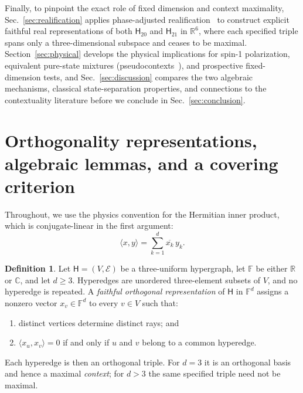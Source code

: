\documentclass[twocolumn,aps,pra,floatfix,amsmath,amssymb,longbibliography]{revtex4-2}
\newenvironment{handrewrite}{\leavevmode\color{blue}}{}
\theoremstyle{definition}
\newtheorem{definition}[theorem]{Definition}
\theoremstyle{remark}
\newcommand{\C}{\mathbb C}
\newcommand{\R}{\mathbb R}
\newcommand{\Htwenty}{\mathsf H_{20}}
\newcommand{\Htwentyone}{\mathsf H_{21}}
\begin{document}
\begin{handrewrite}
Finally, to pinpoint the exact role of fixed dimension and context maximality, Sec.~\ref{sec:realification} applies phase-adjusted realification~\cite{svozil-2025-rvc} to construct explicit faithful real representations of both $\Htwenty$ and $\Htwentyone$ in $\R^6$, where each specified triple spans only a three-dimensional subspace and ceases to be maximal.  Section~\ref{sec:physical} develops the physical implications for spin-1 polarization, equivalent pure-state mixtures (pseudocontexts~\cite{2026-Navara-Svozil-pseudocontexts}), and prospective fixed-dimension tests, and Sec.~\ref{sec:discussion} compares the two algebraic mechanisms, classical state-separation properties, and connections to the contextuality literature before we conclude in Sec.~\ref{sec:conclusion}.
\end{handrewrite}

\section{Orthogonality representations, algebraic lemmas, and a covering criterion}
\label{sec:prelim}

Throughout, we use the physics convention for the Hermitian inner product,
which is conjugate-linear in the first argument:
\begin{equation}
 \langle x,y\rangle=\sum_{k=1}^{d}\overline{x_k}\,y_k.
 \label{eq:inner-product}
\end{equation}

\begin{definition}
\label{def:for}
Let $\mathsf H=(V,\mathcal E)$ be a three-uniform hypergraph, let
$\mathbb F$ be either $\R$ or $\C$, and let $d\ge3$.
Hyperedges are unordered three-element subsets of $V$, and no hyperedge
is repeated.  A \emph{faithful orthogonal representation} of $\mathsf H$ in
$\mathbb F^d$ assigns a nonzero vector $x_v\in\mathbb F^d$ to every $v\in V$
such that:
\begin{enumerate}
\item distinct vertices determine distinct rays; and
\item $\langle x_u,x_v\rangle=0$ if and only if $u$ and $v$ belong to a
common hyperedge.
\end{enumerate}
Each hyperedge is then an orthogonal triple.  For $d=3$ it is an orthogonal
basis and hence a maximal \emph{context}; for $d>3$ the same specified triple
need not be maximal.
\end{definition}
\end{document}
